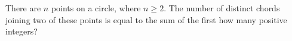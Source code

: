 There are $n$ points on a circle, where $n\ge2$. The number of distinct chords joining two of these points is equal to the sum of the first how many positive integers?
